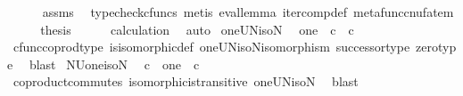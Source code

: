 \begin{isabellebody}
\ \ \ \ \isamarkupfalse%
\ assms\ \isamarkupfalse%
\ {\isacharparenleft}{\kern0pt}typecheck{\isacharunderscore}{\kern0pt}cfuncs{\isacharcomma}{\kern0pt}\ metis\ eval{\isacharunderscore}{\kern0pt}lemma\ iter{\isacharunderscore}{\kern0pt}comp{\isacharunderscore}{\kern0pt}def{}\ metafunc{\isacharunderscore}{\kern0pt}cnufatem{\isacharparenright}{\kern0pt}\isanewline
\ \ \isamarkupfalse%
\ \isamarkupfalse%
\ {\isacharquery}{\kern0pt}thesis\isanewline
\ \ \ \ \isamarkupfalse%
\ calculation\ \isamarkupfalse%
\ auto\isanewline
{}\isamarkupfalse%
%
\endisatagproof
{\isafoldproof}%
%
\isadelimproof
%
\endisadelimproof
%
\isadelimdocument
%
\endisadelimdocument
%
\isatagdocument
%
\isamarkuptrue%
%
\endisatagdocument
{\isafolddocument}%
%
\isadelimdocument
%
\endisadelimdocument
{}\isamarkupfalse%
\ oneUN{\isacharunderscore}{\kern0pt}iso{\isacharunderscore}{\kern0pt}N{\isacharcolon}{\kern0pt}\isanewline
\ \ {\isachardoublequoteopen}one\ {\isasymCoprod}\ {\isasymnat}\isactrlsub c\ {\isasymcong}\ {\isasymnat}\isactrlsub c{\isachardoublequoteclose}\isanewline
%
\isadelimproof
\ \ %
\endisadelimproof
%
\isatagproof
{}\isamarkupfalse%
\ cfunc{\isacharunderscore}{\kern0pt}coprod{\isacharunderscore}{\kern0pt}type\ is{\isacharunderscore}{\kern0pt}isomorphic{\isacharunderscore}{\kern0pt}def\ oneUN{\isacharunderscore}{\kern0pt}iso{\isacharunderscore}{\kern0pt}N{\isacharunderscore}{\kern0pt}isomorphism\ successor{\isacharunderscore}{\kern0pt}type\ zero{\isacharunderscore}{\kern0pt}type\ \isamarkupfalse%
\ blast%
\endisatagproof
{\isafoldproof}%
%
\isadelimproof
\isanewline
%
\endisadelimproof
\isanewline
{}\isamarkupfalse%
\ NUone{\isacharunderscore}{\kern0pt}iso{\isacharunderscore}{\kern0pt}N{\isacharcolon}{\kern0pt}\isanewline
\ \ {\isachardoublequoteopen}{\isasymnat}\isactrlsub c\ {\isasymCoprod}\ one\ {\isasymcong}\ {\isasymnat}\isactrlsub c{\isachardoublequoteclose}\isanewline
%
\isadelimproof
\ \ %
\endisadelimproof
%
\isatagproof
{}\isamarkupfalse%
\ coproduct{\isacharunderscore}{\kern0pt}commutes\ isomorphic{\isacharunderscore}{\kern0pt}is{\isacharunderscore}{\kern0pt}transitive\ oneUN{\isacharunderscore}{\kern0pt}iso{\isacharunderscore}{\kern0pt}N\ \isamarkupfalse%
\ blast%
\endisatagproof
{\isafoldproof}%
%
\isadelimproof
\isanewline
%
\endisadelimproof
%
\isadelimtheory
\ \ \isanewline
%
\endisadelimtheory
%
\isatagtheory
{}\isamarkupfalse%
%
\endisatagtheory
{\isafoldtheory}%
%
\isadelimtheory
%
\endisadelimtheory
%
\end{isabellebody}%
